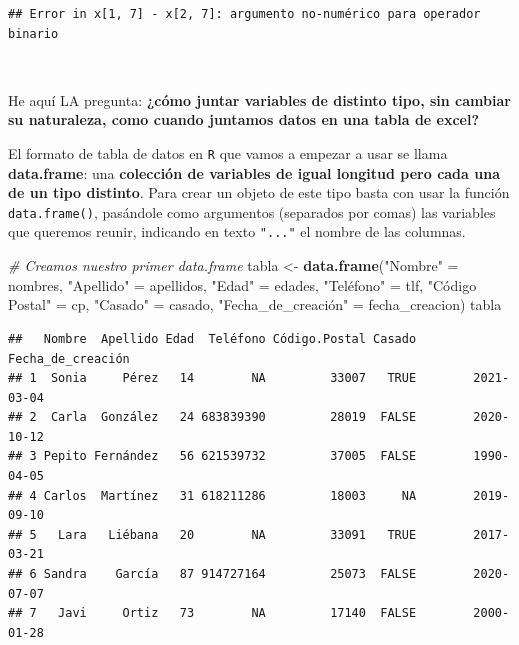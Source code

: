\documentclass[11pt,]{book}
\newenvironment{Shaded}{\begin{snugshade}}{\end{snugshade}}
\newcommand{\CommentTok}[1]{\textcolor[rgb]{0.37,0.37,0.37}{\textit{#1}}}
\newcommand{\KeywordTok}[1]{\textcolor[rgb]{0.27,0.27,0.27}{\textbf{#1}}}
\newcommand{\NormalTok}[1]{#1}
\newcommand{\StringTok}[1]{\textcolor[rgb]{0.5,0.5,0.5}{#1}}
\begin{document}
\begin{verbatim}
## Error in x[1, 7] - x[2, 7]: argumento no-numérico para operador binario
\end{verbatim}

~

He aquí LA pregunta: \textbf{¿cómo juntar variables de distinto tipo, sin cambiar su naturaleza, como cuando juntamos datos en una tabla de excel?}

El formato de tabla de datos en \texttt{R} que vamos a empezar a usar se llama \textbf{data.frame}: una \textbf{colección de variables de igual longitud pero cada una de un tipo distinto}. Para crear un objeto de este tipo basta con usar la función \texttt{data.frame()}, pasándole como argumentos (separados por comas) las variables que queremos reunir, indicando en texto \texttt{"..."} el nombre de las columnas.

\begin{Shaded}
\begin{Highlighting}[]
\CommentTok{# Creamos nuestro primer data.frame}
\NormalTok{tabla <-}\StringTok{ }\KeywordTok{data.frame}\NormalTok{(}\StringTok{"Nombre"}\NormalTok{ =}\StringTok{ }\NormalTok{nombres, }\StringTok{"Apellido"}\NormalTok{ =}\StringTok{ }\NormalTok{apellidos,}
                    \StringTok{"Edad"}\NormalTok{ =}\StringTok{ }\NormalTok{edades, }\StringTok{"Teléfono"}\NormalTok{ =}\StringTok{ }\NormalTok{tlf,}
                    \StringTok{"Código Postal"}\NormalTok{ =}\StringTok{ }\NormalTok{cp, }\StringTok{"Casado"}\NormalTok{ =}\StringTok{ }\NormalTok{casado,}
                    \StringTok{"Fecha_de_creación" = fecha_creacion)}
\StringTok{tabla}
\end{Highlighting}
\end{Shaded}

\begin{verbatim}
##   Nombre  Apellido Edad  Teléfono Código.Postal Casado Fecha_de_creación
## 1  Sonia     Pérez   14        NA         33007   TRUE        2021-03-04
## 2  Carla  González   24 683839390         28019  FALSE        2020-10-12
## 3 Pepito Fernández   56 621539732         37005  FALSE        1990-04-05
## 4 Carlos  Martínez   31 618211286         18003     NA        2019-09-10
## 5   Lara   Liébana   20        NA         33091   TRUE        2017-03-21
## 6 Sandra    García   87 914727164         25073  FALSE        2020-07-07
## 7   Javi     Ortiz   73        NA         17140  FALSE        2000-01-28
\end{verbatim}
\end{document}
